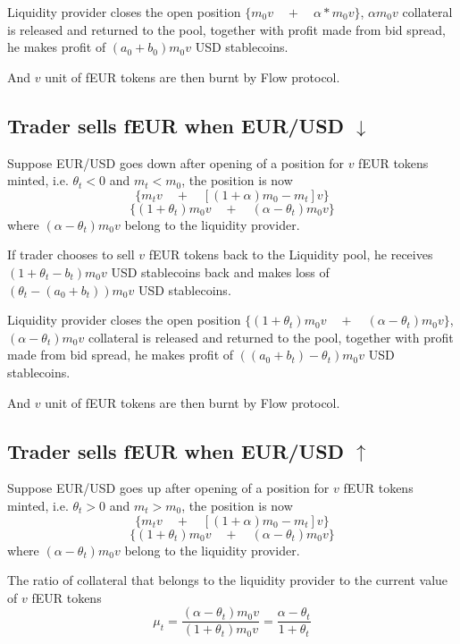 \documentclass{article}
\begin{document}
Liquidity provider closes the open position $\{ m_0v \quad  +  \quad \alpha*m_0v \}$,  $\alpha m_0 v$ collateral is released and returned to the pool, together with profit made from bid spread, he makes profit of $(a_0+b_0) m_0 v$ USD stablecoins. \par

And $v$ unit of fEUR tokens are then burnt by Flow protocol.

\subsection{Trader sells fEUR when EUR/USD $\downarrow$}
Suppose EUR/USD goes down after opening of a position for $v$ fEUR tokens minted, i.e. $\theta_t<0$ and $m_t<m_0$, the position is now
$$\{ m_t v   \quad +  \quad  [(1+\alpha)m_0-m_t]v \}$$
$$\{ (1+\theta_t)m_0 v   \quad +  \quad  (\alpha-\theta_t)m_0 v \}$$
where $(\alpha-\theta_t)m_0 v$ belong to the liquidity provider. \par

If trader chooses to sell $v$ fEUR tokens back to the Liquidity pool, he receives $(1+\theta_t -b_t)m_0 v$ USD stablecoins back and makes loss of  $(\theta_t -(a_0+b_t))m_0 v$ USD stablecoins.\par

Liquidity provider closes the open position $\{ (1+\theta_t)m_0 v   \quad +  \quad  (\alpha-\theta_t)m_0 v \}$, \\ $(\alpha-\theta_t)m_0 v$ collateral is released and returned to the pool, together with profit made from bid spread, he makes profit of $((a_0+b_t) - \theta_t)m_0 v$ USD stablecoins. \par

And $v$ unit of fEUR tokens are then burnt by Flow protocol.

\subsection{Trader sells fEUR when EUR/USD $\uparrow$}
Suppose EUR/USD goes up after opening of a position for $v$ fEUR tokens minted, i.e. $\theta_t>0$ and $m_t>m_0$, the position is now
$$\{ m_t v   \quad +  \quad  [(1+\alpha)m_0-m_t]v \}$$
$$\{ (1+\theta_t)m_0 v   \quad +  \quad  (\alpha-\theta_t)m_0 v \}$$
where $(\alpha-\theta_t)m_0 v$ belong to the liquidity provider. \par

The ratio of collateral that belongs to the liquidity provider to the current value of $v$ fEUR tokens
$$ \mu_t=\frac{(\alpha-\theta_t)m_0 v}{(1+\theta_t)m_0 v}=\frac{\alpha - \theta_t}{1+\theta_t}$$\par
\end{document}
